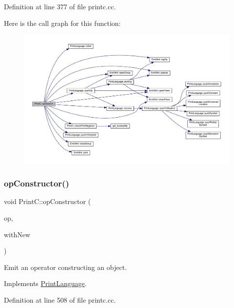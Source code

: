 Definition at line 377 of file printc.\+cc.

Here is the call graph for this function\+:
\nopagebreak
\begin{figure}[H]
\begin{center}
\leavevmode
\includegraphics[width=350pt]{class_print_c_a2987b80bf701c0c300d672d920a36162_cgraph}
\end{center}
\end{figure}
\mbox{\label{class_print_c_aee706d2e639807a35d0a1c161f3da137}} 
\subsubsection{\texorpdfstring{opConstructor()}{opConstructor()}}
{\footnotesize\ttfamily void Print\+C\+::op\+Constructor (\begin{DoxyParamCaption}\item[{const \mbox{\hyperlink{class_pcode_op}{Pcode\+Op}} $\ast$}]{op,  }\item[{bool}]{with\+New }\end{DoxyParamCaption})\hspace{0.3cm}{\ttfamily [virtual]}}



Emit an operator constructing an object. 



Implements \mbox{\hyperlink{class_print_language_a22939be1cb4a9b4e53121092b7be26b6}{Print\+Language}}.



Definition at line 508 of file printc.\+cc.

